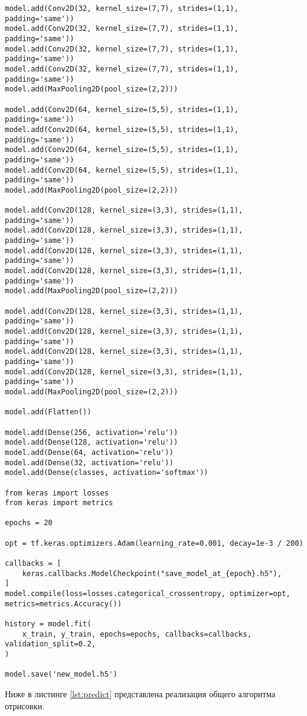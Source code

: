 \begin{lstlisting}[caption = Реализация алгоритма обучения свёрточной нейросети, label = lst:learn]
model.add(Conv2D(32, kernel_size=(7,7), strides=(1,1), padding='same'))
model.add(Conv2D(32, kernel_size=(7,7), strides=(1,1), padding='same'))
model.add(Conv2D(32, kernel_size=(7,7), strides=(1,1), padding='same'))
model.add(Conv2D(32, kernel_size=(7,7), strides=(1,1), padding='same'))
model.add(MaxPooling2D(pool_size=(2,2)))

model.add(Conv2D(64, kernel_size=(5,5), strides=(1,1), padding='same'))
model.add(Conv2D(64, kernel_size=(5,5), strides=(1,1), padding='same'))
model.add(Conv2D(64, kernel_size=(5,5), strides=(1,1), padding='same'))
model.add(Conv2D(64, kernel_size=(5,5), strides=(1,1), padding='same'))
model.add(MaxPooling2D(pool_size=(2,2)))

model.add(Conv2D(128, kernel_size=(3,3), strides=(1,1), padding='same'))
model.add(Conv2D(128, kernel_size=(3,3), strides=(1,1), padding='same'))
model.add(Conv2D(128, kernel_size=(3,3), strides=(1,1), padding='same'))
model.add(Conv2D(128, kernel_size=(3,3), strides=(1,1), padding='same'))
model.add(MaxPooling2D(pool_size=(2,2)))

model.add(Conv2D(128, kernel_size=(3,3), strides=(1,1), padding='same'))
model.add(Conv2D(128, kernel_size=(3,3), strides=(1,1), padding='same'))
model.add(Conv2D(128, kernel_size=(3,3), strides=(1,1), padding='same'))
model.add(Conv2D(128, kernel_size=(3,3), strides=(1,1), padding='same'))
model.add(MaxPooling2D(pool_size=(2,2)))

model.add(Flatten())

model.add(Dense(256, activation='relu'))
model.add(Dense(128, activation='relu'))
model.add(Dense(64, activation='relu'))
model.add(Dense(32, activation='relu'))
model.add(Dense(classes, activation='softmax'))

from keras import losses
from keras import metrics

epochs = 20

opt = tf.keras.optimizers.Adam(learning_rate=0.001, decay=1e-3 / 200)

callbacks = [
    keras.callbacks.ModelCheckpoint("save_model_at_{epoch}.h5"),
]
model.compile(loss=losses.categorical_crossentropy, optimizer=opt, metrics=metrics.Accuracy())

history = model.fit(
    x_train, y_train, epochs=epochs, callbacks=callbacks, validation_split=0.2,
)

model.save('new_model.h5')
\end{lstlisting}

Ниже в листинге \ref{lst:predict} представлена реализация общего алгоритма отрисовки.

